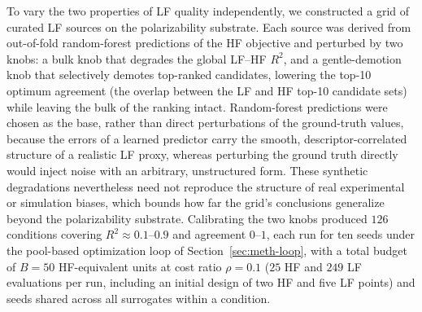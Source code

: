 \documentclass[11pt,a4paper]{article}%
\begin{document}
To vary the two properties of LF quality independently, we constructed a
grid of curated LF sources on the polarizability substrate. Each source was
derived from out-of-fold random-forest predictions of the HF objective and
perturbed by two knobs: a bulk knob that degrades the global LF--HF $R^2$, and a
gentle-demotion knob that selectively demotes top-ranked candidates, lowering the
top-10 optimum agreement (the overlap between the LF and HF top-10
candidate sets) while leaving the bulk of the ranking intact. Random-forest
predictions were chosen as the base, rather than direct perturbations of the
ground-truth values, because the errors of a learned predictor carry the smooth,
descriptor-correlated structure of a realistic LF proxy, whereas perturbing the
ground truth directly would inject noise with an arbitrary, unstructured form.
These synthetic degradations nevertheless need not reproduce the structure of
real experimental or simulation biases, which bounds how far the grid's
conclusions generalize beyond the polarizability substrate. Calibrating the two
knobs produced $126$ conditions covering $R^2 \approx 0.1$--$0.9$ and agreement
$0$--$1$, each run for ten seeds under the pool-based optimization loop of
Section~\ref{sec:meth-loop}, with a total budget of $B = 50$ HF-equivalent units at
cost ratio $\rho = 0.1$ ($25$ HF and $249$ LF evaluations per run, including an
initial design of two HF and five LF points) and seeds shared across all
surrogates within a condition.
\end{document}
